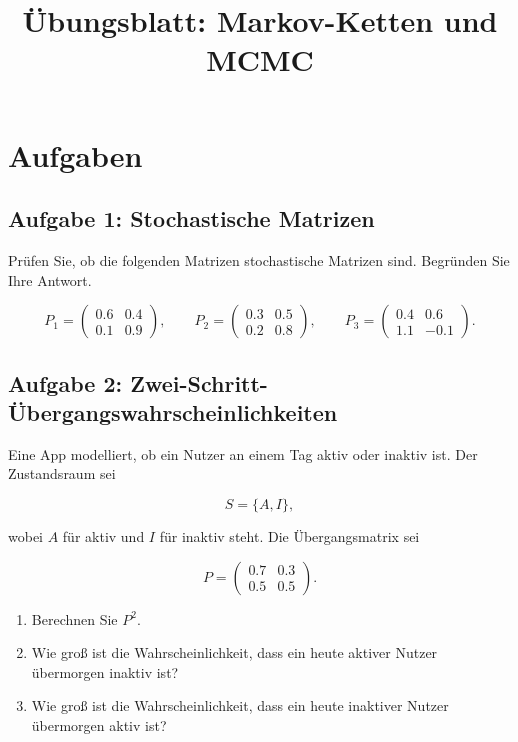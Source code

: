 \documentclass[11pt,a4paper]{article}
\title{Übungsblatt: Markov-Ketten und MCMC}
\author{}
\date{}
\begin{document}
\maketitle

\section*{Aufgaben}

\subsection*{Aufgabe 1: Stochastische Matrizen}

Prüfen Sie, ob die folgenden Matrizen stochastische Matrizen sind. Begründen Sie Ihre Antwort.

\[
P_1 =
\begin{pmatrix}
0.6 & 0.4 \\
0.1 & 0.9
\end{pmatrix},
\qquad
P_2 =
\begin{pmatrix}
0.3 & 0.5 \\
0.2 & 0.8
\end{pmatrix},
\qquad
P_3 =
\begin{pmatrix}
0.4 & 0.6 \\
1.1 & -0.1
\end{pmatrix}.
\]

\subsection*{Aufgabe 2: Zwei-Schritt-Übergangswahrscheinlichkeiten}

Eine App modelliert, ob ein Nutzer an einem Tag aktiv oder inaktiv ist. Der Zustandsraum sei

\[
S = \{A,I\},
\]

wobei $A$ für aktiv und $I$ für inaktiv steht. Die Übergangsmatrix sei

\[
P =
\begin{pmatrix}
0.7 & 0.3 \\
0.5 & 0.5
\end{pmatrix}.
\]

\begin{enumerate}
    \item Berechnen Sie $P^2$.
    \item Wie groß ist die Wahrscheinlichkeit, dass ein heute aktiver Nutzer übermorgen inaktiv ist?
    \item Wie groß ist die Wahrscheinlichkeit, dass ein heute inaktiver Nutzer übermorgen aktiv ist?
\end{enumerate}
\end{document}

